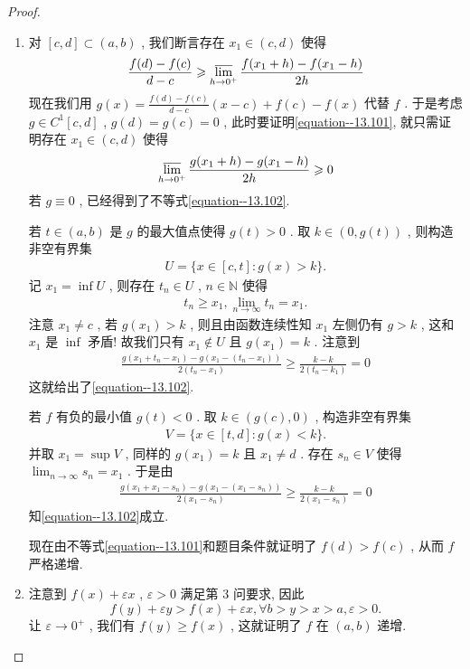 \documentclass[../../main.tex]{subfiles}%
\begin{document}
\begin{proof}
\begin{enumerate}
\item 对 \([c, d] \subset (a, b)\) , 我们断言存在 \(x_1 \in (c, d)\) 使得
\begin{align}
\frac{f(d) - f(c)}{d - c} \geqslant  \varlimsup_{h \to 0^+} \frac{f(x_1 + h) - f(x_1 - h)}{2h} \label{equation--13.101}
\end{align}
现在我们用 \(g(x) = \frac{f(d) - f(c)}{d - c}(x - c) + f(c) - f(x)\) 代替 \(f\) . 于是考虑 \(g \in C^1[c, d]\) , \(g(d) = g(c) = 0\) , 此时要证明\eqref{equation--13.101}, 就只需证明存在 \(x_1 \in (c, d)\) 使得
\begin{align}
\varlimsup_{h \to 0^+} \frac{g(x_1 + h) - g(x_1 - h)}{2h} \geqslant  0 \label{equation--13.102}
\end{align}
若 \(g \equiv 0\) , 已经得到了不等式\eqref{equation--13.102}.

若 \(t \in (a, b)\) 是 \(g\) 的最大值点使得 \(g(t) > 0\) . 取 \(k \in (0, g(t))\) , 则构造非空有界集
\begin{align*}
U = \{x \in [c, t] : g(x) > k\}.
\end{align*}
记 \(x_1 = \inf U\) , 则存在 \(t_n \in U\) , \(n \in \mathbb{N}\) 使得
\begin{align*}
t_n \geqslant  x_1 , \lim_{n \to \infty} t_n = x_1.
\end{align*}
注意 \(x_1 \neq c\) , 若 \(g(x_1) > k\) , 则且由函数连续性知 \(x_1\) 左侧仍有 \(g > k\) , 这和 \(x_1\) 是 \(\inf\) 矛盾! 故我们只有 \(x_1 \notin U\) 且 \(g(x_1) = k\) . 注意到
\begin{align*}
\frac{g(x_1 + t_n - x_1) - g(x_1 - (t_n - x_1))}{2(t_n - x_1)} \geqslant  \frac{k - k}{2(t_n - k_1)} = 0
\end{align*}
这就给出了\eqref{equation--13.102}.

若 \(f\) 有负的最小值 \(g(t) < 0\) . 取 \(k \in (g(c), 0)\) , 构造非空有界集
\begin{align*}
V = \{x \in [t, d] : g(x) < k\}.
\end{align*}
并取 \(x_1 = \sup V\) , 同样的 \(g(x_1) = k\) 且 \(x_1 \neq d\) . 存在 \(s_n \in V\) 使得 \(\lim_{n \to \infty} s_n = x_1\) . 于是由
\begin{align*}
\frac{g(x_1 + x_1 - s_n) - g(x_1 - (x_1 - s_n))}{2(x_1 - s_n)} \geqslant  \frac{k - k}{2(x_1 - s_n)} = 0
\end{align*}
知\eqref{equation--13.102}成立.

现在由不等式\eqref{equation--13.101}和题目条件就证明了 \(f(d) > f(c)\) , 从而 \(f\) 严格递增.

\item 注意到 \(f(x) + \varepsilon x\) , \(\varepsilon > 0\) 满足第 3 问要求, 因此
\[f(y) + \varepsilon y > f(x) + \varepsilon x ,\forall b > y > x > a , \varepsilon > 0.\]
让 \(\varepsilon \to 0^+\) , 我们有 \(f(y) \geqslant  f(x)\) , 这就证明了 \(f\) 在 \((a, b)\) 递增. 
\end{enumerate}
\end{proof}
\end{document}
